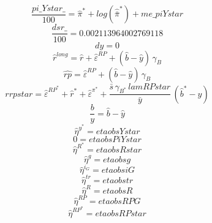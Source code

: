 \begin{dmath}
\frac{{pi\_Ystar\_}}{100}={\hat{\pi}^*}+log\left({\hat{\bar{\pi}}^*}\right)+{me\_piYstar}
\end{dmath}
\begin{dmath}
\frac{{dsr\_}}{100}=0.002113964002769118
\end{dmath}
\begin{dmath}
{dy}=0
\end{dmath}
\begin{dmath}
{\hat{r}^{long}}={\hat{r}}+{\hat{\varepsilon}^{RP}}+\left({\hat{b}}-{\hat{y}}\right)\, {\gamma_{B}}
\end{dmath}
\begin{dmath}
{\hat{rp}}={\hat{\varepsilon}^{RP}}+\left({\hat{b}}-{\hat{y}}\right)\, {\gamma_{B}}
\end{dmath}
\begin{dmath}
{rrpstar}={\hat{\varepsilon}^{RP^*}}+{\hat{r}^*}+{\hat{\varepsilon}^{\pi^*}}+\frac{{\bar{s}}\, {\gamma_{B^*}}\, {lamRPstar}}{{\bar{y}}}\, \left({\hat{b}^*}-{\hat{y}}\right)
\end{dmath}
\begin{dmath}
{\frac{b}{y}}={\hat{b}}-{\hat{y}}
\end{dmath}
\begin{dmath}
{\hat{\eta}^{y^*}}={etaobsYstar}
\end{dmath}
\begin{dmath}
0={etaobsPiYstar}
\end{dmath}
\begin{dmath}
{\hat{\eta}^{R^*}}={etaobsRstar}
\end{dmath}
\begin{dmath}
{\hat{\eta}^{g}}={etaobsg}
\end{dmath}
\begin{dmath}
{\hat{\eta}^{i_G}}={etaobsiG}
\end{dmath}
\begin{dmath}
{\hat{\eta}^{tr}}={etaobstr}
\end{dmath}
\begin{dmath}
{\hat{\eta}^{R}}={etaobsR}
\end{dmath}
\begin{dmath}
{\hat{\eta}^{RP}}={etaobsRPG}
\end{dmath}
\begin{dmath}
{\hat{\eta}^{RP^*}}={etaobsRPstar}
\end{dmath}
